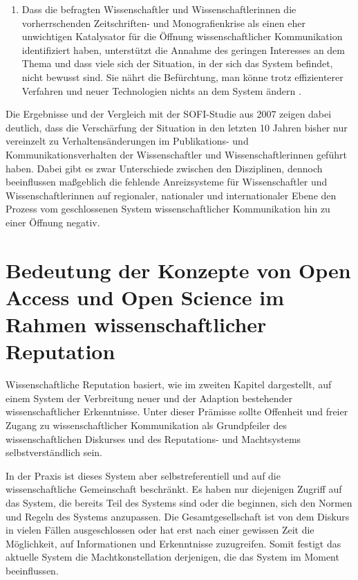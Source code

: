 \begin{enumerate}
\item Dass die befragten Wissenschaftler und Wissenschaftlerinnen die vorherrschenden Zeitschriften- und Monografienkrise als einen eher unwichtigen Katalysator für die Öffnung wissenschaftlicher Kommunikation identifiziert haben, unterstützt die Annahme des geringen Interesses an dem Thema und dass viele sich der Situation, in der sich das System befindet, nicht bewusst sind. Sie nährt die Befürchtung, man könne trotz effizienterer Verfahren und neuer Technologien nichts an dem System ändern \cite{Parks_2002_acadamic_faust}.
\end{enumerate}

Die Ergebnisse und der Vergleich mit der SOFI-Studie aus 2007 zeigen dabei deutlich, dass die Verschärfung der Situation in den letzten 10 Jahren bisher nur vereinzelt zu Verhaltensänderungen im Publikations- und Kommunikationsverhalten der Wissenschaftler und Wissenschaftlerinnen geführt haben. Dabei gibt es zwar Unterschiede zwischen den Disziplinen, dennoch beeinflussen maßgeblich die fehlende Anreizsysteme für Wissenschaftler und Wissenschaftlerinnen auf regionaler, nationaler und internationaler Ebene den Prozess vom geschlossenen System wissenschaftlicher Kommunikation hin zu einer Öffnung negativ.

\section{Bedeutung der Konzepte von Open Access und Open Science im Rahmen wissenschaftlicher Reputation}

Wissenschaftliche Reputation basiert, wie im zweiten Kapitel dargestellt, auf einem System der Verbreitung neuer und der Adaption bestehender wissenschaftlicher Erkenntnisse. Unter dieser Prämisse sollte Offenheit und freier Zugang zu wissenschaftlicher Kommunikation als Grundpfeiler des wissenschaftlichen Diskurses und des Reputations- und Machtsystems selbstverständlich sein.

In der Praxis ist dieses System aber selbstreferentiell und auf die wissenschaftliche Gemeinschaft beschränkt. Es haben nur diejenigen Zugriff auf das System, die bereits Teil des Systems sind oder die beginnen, sich den Normen und Regeln des Systems anzupassen. Die Gesamtgesellschaft ist von dem Diskurs in vielen Fällen ausgeschlossen oder hat erst nach einer gewissen Zeit die Möglichkeit, auf Informationen und Erkenntnisse zuzugreifen. Somit festigt das aktuelle System die Machtkonstellation derjenigen, die das System im Moment beeinflussen.

